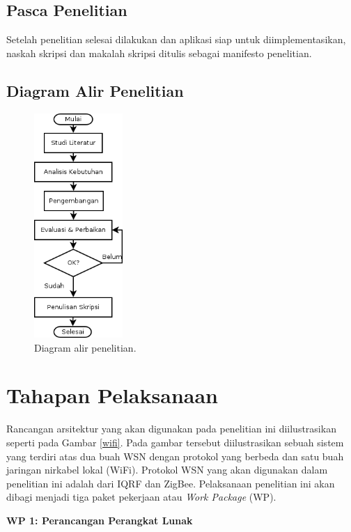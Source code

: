 	\subsection{Pasca Penelitian}
		Setelah penelitian selesai dilakukan dan aplikasi siap untuk diimplementasikan, naskah skripsi dan makalah skripsi ditulis sebagai manifesto penelitian.

	\subsection{Diagram Alir Penelitian}
		\begin{figure}[ht!]
		  \centering
		    \includegraphics[width=0.3\textwidth]{gambar/flowchart}
		    \caption{Diagram alir penelitian.}
		    \label{flowchart-penelitian}
		\end{figure}


\section{Tahapan Pelaksanaan}
	Rancangan arsitektur yang akan digunakan pada penelitian ini diilustrasikan seperti pada Gambar \ref{wifi}. Pada gambar tersebut diilustrasikan sebuah sistem yang terdiri atas dua buah WSN dengan protokol yang berbeda dan satu buah jaringan nirkabel lokal (WiFi). Protokol WSN yang akan digunakan dalam penelitian ini adalah dari IQRF dan ZigBee. Pelaksanaan penelitian ini akan dibagi menjadi tiga paket pekerjaan atau \emph{Work Package} (WP).

	\noindent\textbf{WP 1: Perancangan Perangkat Lunak}


